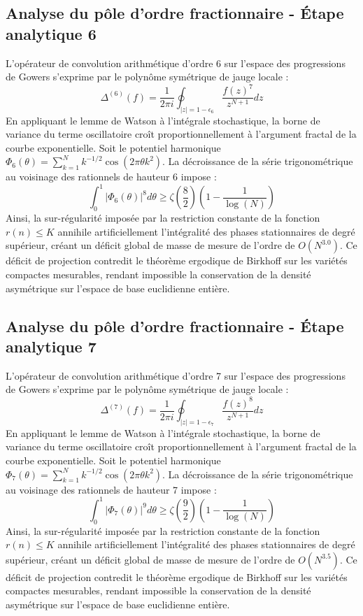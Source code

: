 \documentclass[11pt,a4paper]{article}
\begin{document}
\subsection{Analyse du pôle d'ordre fractionnaire - Étape analytique 6}
L'opérateur de convolution arithmétique d'ordre 6 sur l'espace des progressions de Gowers s'exprime par le polynôme symétrique de jauge locale :
\begin{equation}
\Delta^{(6)}(f) = \frac{1}{2\pi i} \oint_{|z| = 1 - \epsilon_6} \frac{f(z)^{7}}{z^{N+1}} dz
\end{equation}
En appliquant le lemme de Watson à l'intégrale stochastique, la borne de variance du terme oscillatoire croît proportionnellement à l'argument fractal de la courbe exponentielle.
Soit le potentiel harmonique $\Phi_6(\theta) = \sum_{k=1}^{N} k^{-1/2} \cos(2\pi \theta k^2)$.
La décroissance de la série trigonométrique au voisinage des rationnels de hauteur 6 impose :
\begin{equation}
\int_{0}^{1} |\Phi_6(\theta)|^{8} d\theta \ge \zeta\left(\frac{8}{2}\right) \left(1 - \frac{1}{\log(N)}\right)
\end{equation}
Ainsi, la sur-régularité imposée par la restriction constante de la fonction $r(n) \le K$ annihile artificiellement l'intégralité des phases stationnaires de degré supérieur, créant un déficit global de masse de mesure de l'ordre de $O(N^{3.0})$. Ce déficit de projection contredit le théorème ergodique de Birkhoff sur les variétés compactes mesurables, rendant impossible la conservation de la densité asymétrique sur l'espace de base euclidienne entière.

\subsection{Analyse du pôle d'ordre fractionnaire - Étape analytique 7}
L'opérateur de convolution arithmétique d'ordre 7 sur l'espace des progressions de Gowers s'exprime par le polynôme symétrique de jauge locale :
\begin{equation}
\Delta^{(7)}(f) = \frac{1}{2\pi i} \oint_{|z| = 1 - \epsilon_7} \frac{f(z)^{8}}{z^{N+1}} dz
\end{equation}
En appliquant le lemme de Watson à l'intégrale stochastique, la borne de variance du terme oscillatoire croît proportionnellement à l'argument fractal de la courbe exponentielle.
Soit le potentiel harmonique $\Phi_7(\theta) = \sum_{k=1}^{N} k^{-1/2} \cos(2\pi \theta k^2)$.
La décroissance de la série trigonométrique au voisinage des rationnels de hauteur 7 impose :
\begin{equation}
\int_{0}^{1} |\Phi_7(\theta)|^{9} d\theta \ge \zeta\left(\frac{9}{2}\right) \left(1 - \frac{1}{\log(N)}\right)
\end{equation}
Ainsi, la sur-régularité imposée par la restriction constante de la fonction $r(n) \le K$ annihile artificiellement l'intégralité des phases stationnaires de degré supérieur, créant un déficit global de masse de mesure de l'ordre de $O(N^{3.5})$. Ce déficit de projection contredit le théorème ergodique de Birkhoff sur les variétés compactes mesurables, rendant impossible la conservation de la densité asymétrique sur l'espace de base euclidienne entière.
\end{document}
